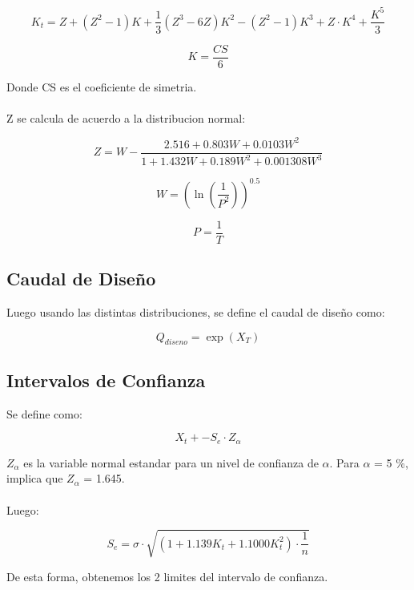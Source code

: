 \begin{equation}
    K_t = Z + (Z^2 - 1)K + \frac{1}{3}(Z^3 - 6Z)K^2 - (Z^2-1)K^3 + Z\cdot K^4 + \frac{K^5}{3}
\end{equation}

\begin{equation}
    K = \frac{CS}{6}
\end{equation}

Donde CS es el coeficiente de simetria.
\\ \\
Z se calcula de acuerdo a la distribucion normal:

\begin{equation}
    Z = W -  \frac{2.516 + 0.803W + 0.0103W^2}{1 + 1.432W + 0.189W^2 + 0.001308W^3}
\end{equation}

\begin{equation}
    W = (\ln(\frac{1}{P^2}))^{0.5}
\end{equation}

\begin{equation}
    P = \frac{1}{T}
\end{equation}

\subsection{Caudal de Diseño}

Luego usando las distintas distribuciones, se define el caudal de diseño como:

\begin{equation}
    Q_{diseno} = \exp(X_T)
\end{equation}

\subsection{Intervalos de Confianza}

Se define como:

\begin{equation}
    X_t + - S_e \cdot Z_{\alpha}
\end{equation}

\textbf{$Z_{\alpha}$} es la variable normal estandar para un nivel de confianza de $\alpha$. Para $\alpha$ = 5 \%, implica que $Z_{\alpha}$ = 1.645. 
\\ \\
Luego:

\begin{equation}
    S_e = \sigma \cdot \sqrt{(1+1.139K_t + 1.1000K_t^2) \cdot \frac{1}{n}}
\end{equation}

De esta forma, obtenemos los 2 limites del intervalo de confianza.